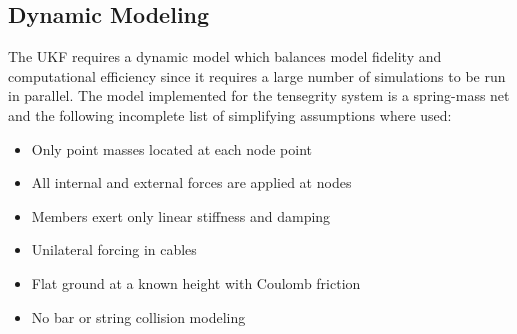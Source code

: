 {\subsection{Dynamic Modeling} 
\label{sec:dynamic_modeling_sb}

The UKF requires a dynamic model which balances model fidelity and computational efficiency since it requires a large number of simulations to be run in parallel. 
The model implemented for the tensegrity system is a spring-mass net and the following incomplete list of simplifying assumptions where used:
\begin{itemize}
  \item Only point masses located at each node point
  \item All internal and external forces are applied at nodes
  \item Members exert only linear stiffness and damping
  \item Unilateral forcing in cables
  \item Flat ground at a known height with Coulomb friction
  \item No bar or string collision modeling
\end{itemize}

}
